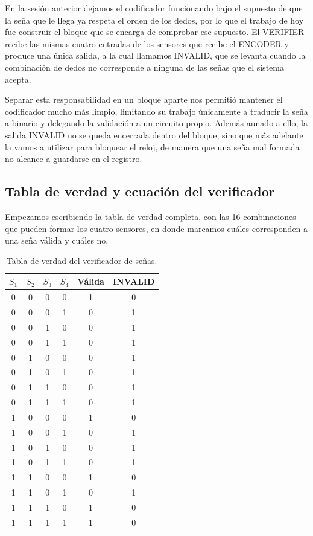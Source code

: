 \documentclass[12pt]{article}
\begin{document}
En la sesión anterior dejamos el codificador funcionando bajo el supuesto de que
la seña que le llega ya respeta el orden de los dedos, por lo que el trabajo de
hoy fue construir el bloque que se encarga de comprobar ese supuesto. El VERIFIER
recibe las mismas cuatro entradas de los sensores que recibe el ENCODER y produce
una única salida, a la cual llamamos INVALID, que se levanta cuando la combinación
de dedos no corresponde a ninguna de las señas que el sistema acepta.

Separar esta responsabilidad en un bloque aparte nos permitió mantener el
codificador mucho más limpio, limitando su trabajo únicamente a traducir la seña a
binario y delegando la validación a un circuito propio. Además aunado a ello, la
salida INVALID no se queda encerrada dentro del bloque, sino que más adelante la
vamos a utilizar para bloquear el reloj, de manera que una seña mal formada no
alcance a guardarse en el registro.

\subsection{Tabla de verdad y ecuación del verificador}

Empezamos escribiendo la tabla de verdad completa, con las 16 combinaciones que
pueden formar los cuatro sensores, en donde marcamos cuáles corresponden a una
seña válida y cuáles no.

\begin{table}[H]
\centering
\begin{tabular}{cccc|c|c}
$S_1$ & $S_2$ & $S_3$ & $S_4$ & Válida & INVALID \\
\hline
0 & 0 & 0 & 0 & 1 & 0 \\
0 & 0 & 0 & 1 & 0 & 1 \\
0 & 0 & 1 & 0 & 0 & 1 \\
0 & 0 & 1 & 1 & 0 & 1 \\
0 & 1 & 0 & 0 & 0 & 1 \\
0 & 1 & 0 & 1 & 0 & 1 \\
0 & 1 & 1 & 0 & 0 & 1 \\
0 & 1 & 1 & 1 & 0 & 1 \\
1 & 0 & 0 & 0 & 1 & 0 \\
1 & 0 & 0 & 1 & 0 & 1 \\
1 & 0 & 1 & 0 & 0 & 1 \\
1 & 0 & 1 & 1 & 0 & 1 \\
1 & 1 & 0 & 0 & 1 & 0 \\
1 & 1 & 0 & 1 & 0 & 1 \\
1 & 1 & 1 & 0 & 1 & 0 \\
1 & 1 & 1 & 1 & 1 & 0 \\
\end{tabular}
\caption{Tabla de verdad del verificador de señas.}
\end{table}
\end{document}
